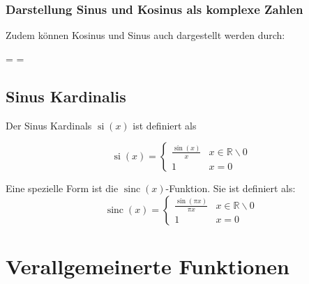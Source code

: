 \documentclass[12pt, a4paper]{scrartcl}
\newenvironment{mathframed}{\empheq[box={\fbox}]{align*}}{\endempheq}
\renewcommand{\im}{\textcolor{myred}{i}}
\begin{document}
\subsubsection{Darstellung Sinus und Kosinus als komplexe Zahlen}

Zudem können Kosinus und Sinus auch dargestellt werden durch:

\begin{mathframed}
  \cos \varphi = \frac{e^{\im \varphi} + e^{- \im \varphi}}{2} \qquad
  \sin \varphi = \frac{e^{\im \varphi} - e^{- \im \varphi}}{2 \im}
\end{mathframed}

\subsection{Sinus Kardinalis}

\begin{minipage}{.5\linewidth}
Der Sinus Kardinals \(\operatorname{si}(x)\) ist definiert als

\[
  \operatorname{si}(x)=
  \begin{cases}
    \frac{\sin(x)}{x} & x \in \mathbb{R} \backslash 0\\
    1 & x = 0
  \end{cases}
\]
\end{minipage}%
\begin{minipage}{.5\linewidth}
\end{minipage}

\begin{minipage}{.5\linewidth}
  Eine spezielle Form ist die \(\operatorname{sinc}(x)\)-Funktion. Sie ist definiert als:
  \[
    \operatorname{sinc}(x)=
    \begin{cases}
      \frac{\sin(\pi x)}{\pi x} & x \in\mathbb{R} \backslash 0\\
      1 & x = 0
    \end{cases}
  \]
\end{minipage}%
\begin{minipage}{.5\linewidth}
\end{minipage}


\section{Verallgemeinerte Funktionen}
\end{document}
